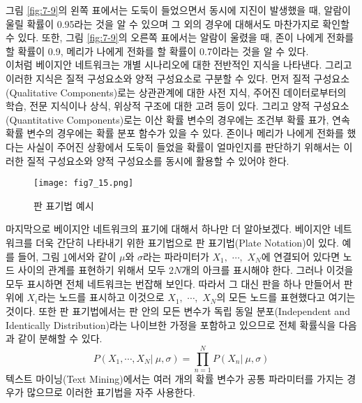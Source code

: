 \documentclass[a4paper]{oblivoir}
\begin{document}
그림 \ref{fig:7-9}의 왼쪽 표에서는 도둑이 들었으면서 동시에 지진이 발생했을 때, 알람이 울릴 확률이 0.95라는 것을 알 수 있으며 그 외의 경우에 대해서도 마찬가지로 확인할 수 있다. 또한, 그림 \ref{fig:7-9}의 오른쪽 표에서는 알람이 울렸을 때, 존이 나에게 전화를 할 확률이 0.9, 메리가 나에게 전화를 할 확률이 0.7이라는 것을 알 수 있다. \\

이처럼 베이지안 네트워크는 개별 시나리오에 대한 전반적인 지식을 나타낸다. 그리고 이러한 지식은 질적 구성요소와 양적 구성요소로 구분할 수 있다. 먼저 질적 구성요소(Qualitative Components)로는 상관관계에 대한 사전 지식, 주어진 데이터로부터의 학습, 전문 지식이나 상식, 위상적 구조에 대한 고려 등이 있다. 그리고 양적 구성요소(Quantitative Components)로는 이산 확률 변수의 경우에는 조건부 확률 표가, 연속 확률 변수의 경우에는 확률 분포 함수가 있을 수 있다. 존이나 메리가 나에게 전화를 했다는 사실이 주어진 상황에서 도둑이 들었을 확률이 얼마인지를 판단하기 위해서는 이러한 질적 구성요소와 양적 구성요소를 동시에 활용할 수 있어야 한다. \\

\begin{figure}[ht] \centering 
\texttt{[image: fig7\_15.png]} 
\caption{판 표기법 예시}
\label{fig:7-13-1}
\end{figure} 

마지막으로 베이지안 네트워크의 표기에 대해서 하나만 더 알아보겠다. 베이지안 네트워크를 더욱 간단히 나타내기 위한 표기법으로 판 표기법(Plate Notation)이 있다. 예를 들어, 그림 \ref{fig:7-13-1}에서와 같이 $\mu$와 $\sigma$라는 파라미터가 $X_1,$ $\cdots,$ $X_N$에 연결되어 있다면 노드 사이의 관계를 표현하기 위해서 모두 $2N$개의 아크를 표시해야 한다. 그러나 이것을 모두 표시하면 전체 네트워크는 번잡해 보인다. 따라서 그 대신 판을 하나 만들어서 판 위에 $X_i$라는 노드를 표시하고 이것으로 $X_1,$ $\cdots,$ $X_N$의 모든 노드를 표현했다고 여기는 것이다. 또한 판 표기법에서는 판 안의 모든 변수가 독립 동일 분포(Independent and Identically Distribution)라는 나이브한 가정을 포함하고 있으므로 전체 확률식을 다음과 같이 분해할 수 있다.
\begin{equation}
P(X_1,\cdots,X_N | \ \mu,\sigma) = \prod_{n=1}^{N} P(X_n| \ \mu,\sigma)
\label{eq:7-13-2}
\end{equation}
텍스트 마이닝(Text Mining)에서는 여러 개의 확률 변수가 공통 파라미터를 가지는 경우가 많으므로 이러한 표기법을 자주 사용한다. \\ 

\end{document}
